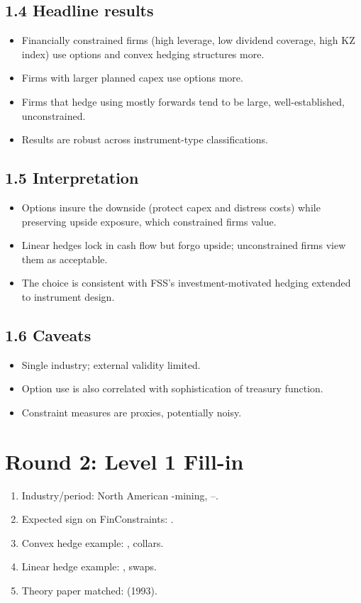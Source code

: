 \documentclass[11pt]{article}
\newcommand{\blank}[1]{\underline{\hspace{#1}}}
\begin{document}
\subsection*{1.4 Headline results}
\begin{itemize}
\item Financially constrained firms (high leverage, low dividend coverage, high KZ index) use options and convex hedging structures more.
\item Firms with larger planned capex use options more.
\item Firms that hedge using mostly forwards tend to be large, well-established, unconstrained.
\item Results are robust across instrument-type classifications.
\end{itemize}

\subsection*{1.5 Interpretation}
\begin{itemize}
\item Options insure the downside (protect capex and distress costs) while preserving upside exposure, which constrained firms value.
\item Linear hedges lock in cash flow but forgo upside; unconstrained firms view them as acceptable.
\item The choice is consistent with FSS's investment-motivated hedging extended to instrument design.
\end{itemize}

\subsection*{1.6 Caveats}
\begin{alertbox}
\begin{itemize}
\item Single industry; external validity limited.
\item Option use is also correlated with sophistication of treasury function.
\item Constraint measures are proxies, potentially noisy.
\end{itemize}
\end{alertbox}

\section*{Round 2: Level 1 Fill-in}
\begin{enumerate}
\item Industry/period: North American \blank{1cm}-mining, \blank{1cm}--\blank{1cm}.
\item Expected sign on FinConstraints: \blank{1cm}.
\item Convex hedge example: \blank{1cm}, collars.
\item Linear hedge example: \blank{1.5cm}, swaps.
\item Theory paper matched: \blank{2cm} (1993).
\end{enumerate}
\end{document}

